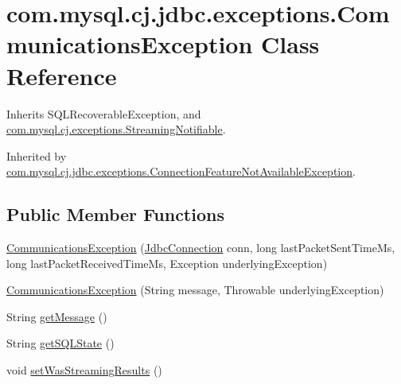 \hypertarget{classcom_1_1mysql_1_1cj_1_1jdbc_1_1exceptions_1_1_communications_exception}{}\section{com.\+mysql.\+cj.\+jdbc.\+exceptions.\+Communications\+Exception Class Reference}
\label{classcom_1_1mysql_1_1cj_1_1jdbc_1_1exceptions_1_1_communications_exception}


Inherits S\+Q\+L\+Recoverable\+Exception, and \mbox{\hyperlink{interfacecom_1_1mysql_1_1cj_1_1exceptions_1_1_streaming_notifiable}{com.\+mysql.\+cj.\+exceptions.\+Streaming\+Notifiable}}.



Inherited by \mbox{\hyperlink{classcom_1_1mysql_1_1cj_1_1jdbc_1_1exceptions_1_1_connection_feature_not_available_exception}{com.\+mysql.\+cj.\+jdbc.\+exceptions.\+Connection\+Feature\+Not\+Available\+Exception}}.

\subsection*{Public Member Functions}
\begin{DoxyCompactItemize}
\item 
\mbox{\hyperlink{classcom_1_1mysql_1_1cj_1_1jdbc_1_1exceptions_1_1_communications_exception_a7f4c2d50e516af22b690b858bb6ce620}{Communications\+Exception}} (\mbox{\hyperlink{interfacecom_1_1mysql_1_1cj_1_1jdbc_1_1_jdbc_connection}{Jdbc\+Connection}} conn, long last\+Packet\+Sent\+Time\+Ms, long last\+Packet\+Received\+Time\+Ms, Exception underlying\+Exception)
\item 
\mbox{\hyperlink{classcom_1_1mysql_1_1cj_1_1jdbc_1_1exceptions_1_1_communications_exception_a2947d467151f9fca74a3af4e29a44cc3}{Communications\+Exception}} (String message, Throwable underlying\+Exception)
\item 
String \mbox{\hyperlink{classcom_1_1mysql_1_1cj_1_1jdbc_1_1exceptions_1_1_communications_exception_a76c0204d0e1d7227770114662433a7da}{get\+Message}} ()
\item 
String \mbox{\hyperlink{classcom_1_1mysql_1_1cj_1_1jdbc_1_1exceptions_1_1_communications_exception_a98a2ad5b51b736dc3ec58edae855462d}{get\+S\+Q\+L\+State}} ()
\item 
void \mbox{\hyperlink{classcom_1_1mysql_1_1cj_1_1jdbc_1_1exceptions_1_1_communications_exception_a29388ae45258ad923ba62072c51507ae}{set\+Was\+Streaming\+Results}} ()
\end{DoxyCompactItemize}



